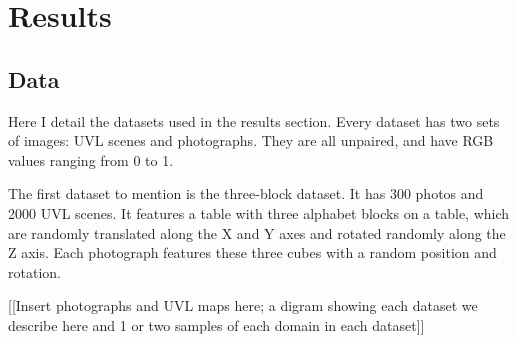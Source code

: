 \documentclass{article}
\begin{document}


\section{Results}

\subsection{Data}

Here I detail the datasets used in the results section. 
Every dataset has two sets of images: UVL scenes and photographs. They are all unpaired, and have RGB values ranging from 0 to 1.

The first dataset to mention is the three-block dataset.  
It has 300 photos and 2000 UVL scenes. It features a table with three alphabet blocks on a table, which are randomly translated along the X and Y axes and rotated randomly along the Z axis. Each photograph features these three cubes with a random position and rotation.

[[Insert photographs and UVL maps here; a digram showing each dataset we describe here and 1 or two samples of each domain in each dataset]]



\end{document}
